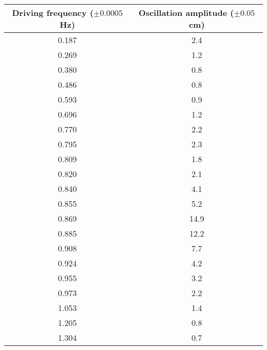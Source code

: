 \begin{tabular}{cc}
\toprule
 Driving frequency ($\pm 0.0005$ Hz) &  Oscillation amplitude ($\pm 0.05$ cm) \\
\midrule
                               0.187 &                                    2.4 \\
                               0.269 &                                    1.2 \\
                               0.380 &                                    0.8 \\
                               0.486 &                                    0.8 \\
                               0.593 &                                    0.9 \\
                               0.696 &                                    1.2 \\
                               0.770 &                                    2.2 \\
                               0.795 &                                    2.3 \\
                               0.809 &                                    1.8 \\
                               0.820 &                                    2.1 \\
                               0.840 &                                    4.1 \\
                               0.855 &                                    5.2 \\
                               0.869 &                                   14.9 \\
                               0.885 &                                   12.2 \\
                               0.908 &                                    7.7 \\
                               0.924 &                                    4.2 \\
                               0.955 &                                    3.2 \\
                               0.973 &                                    2.2 \\
                               1.053 &                                    1.4 \\
                               1.205 &                                    0.8 \\
                               1.304 &                                    0.7 \\
\bottomrule
\end{tabular}
